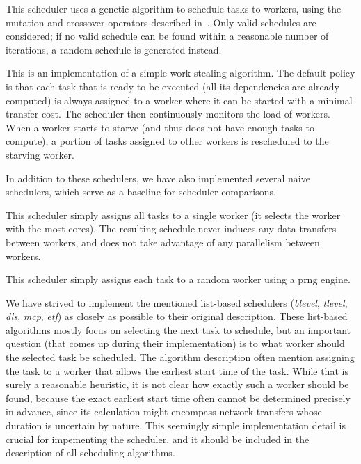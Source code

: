\begin{description}[wide=0pt]
	\item[genetic]
		This scheduler uses a genetic algorithm to schedule tasks to workers, using the mutation and
		crossover operators described in~\cite{omara2009genetic}. Only valid schedules are considered; if no
		valid schedule can be found within a reasonable number of iterations, a random schedule is
		generated instead.

	\item[ws]
		This is an implementation of a simple work-stealing algorithm. The default policy is that each task
		that is ready to be executed (all its dependencies are already computed) is always assigned to a
		worker where it can be started with a minimal transfer cost. The scheduler then continuously
		monitors the load of workers. When a worker starts to starve (and thus does not have enough tasks
		to compute), a portion of tasks assigned to other workers is rescheduled to the starving
		worker.
\end{description}

In addition to these schedulers, we have also implemented several naive schedulers, which serve as
a baseline for scheduler comparisons.

\begin{description}[wide=0pt]
	\item[single]
		This scheduler simply assigns all tasks to a single worker (it selects the worker with the most
		cores). The resulting schedule never induces any data transfers between workers, and does not take
		advantage of any parallelism between workers.
	\item[random]
		This scheduler simply assigns each task to a random worker using a \gls{prng} engine.
\end{description}

We have strived to implement the mentioned list-based schedulers (\emph{blevel},
\emph{tlevel}, \emph{dls}, \emph{mcp}, \emph{etf})
as closely as possible to their original description. These list-based algorithms mostly focus on
selecting the next task to schedule, but an important question (that comes up during their
implementation) is to what worker should the selected task be scheduled. The algorithm description
often mention assigning the task to a worker that allows the earliest start time of the task. While
that is surely a reasonable heuristic, it is not clear how exactly such a worker should be found,
because the exact earliest start time often cannot be determined precisely in advance, since its
calculation might encompass network transfers whose duration is uncertain by nature. This seemingly
simple implementation detail is crucial for impementing the scheduler, and it should be included in
the description of all scheduling algorithms.

